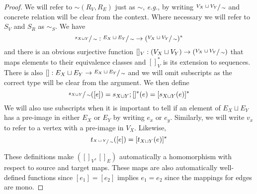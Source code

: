 \begin{proof}
	We will refer to $\sim (R_{V},R_{E})$ just as $\sim$, \textit{e.g.}, by writing $\sfrac{V_{X} \sqcup  V_{Y}}{\sim}$ and concrete relation will be clear from the context.
	Where necessary we will refer to $S_{V}$ and $S_{R}$ as $\sim_{S}$.
	We have
	\[
		\sfrac{s_{X\sqcup Y}}{\sim} : \sfrac{E_{X} \sqcup  E_{Y}}{\sim} \to (\sfrac{V_{X} \sqcup  V_{Y}}{\sim})^{*}
	\]
	and there is an obvious surjective function $[]_{V} : (V_{X} \sqcup  V_{Y}) \to (\sfrac{V_{X} \sqcup  V_{Y}}{\sim})$ that maps elements to their equivalence classes and $[]_{V}^{*}$ is its extension to sequences.
	There is also $[] : E_{X} \sqcup  E_{Y} \to \sfrac{E_{X} \sqcup  E_{Y}}{\sim}$ and we will omit subscripts as the correct type will be clear from the argument.
	We then define
	\[
		\sfrac{s_{X\sqcup Y}}{\sim}([e]) = s_{X\sqcup Y};[]^{*}(e) = [s_{X\sqcup Y}(e)]^{*}
	\]
	We will also use subscripts when it is important to tell if an element of $E_{X} \sqcup  E_{Y}$ has a pre-image in either $E_{X}$ or $E_{Y}$ by writing $e_{x}$ or $e_{y}$.
	Similarly, we will write $v_{x}$ to refer to a vertex with a pre-image in $V_{X}$.
	Likewise,
	\[
		t_{\sfrac{X\sqcup Y}{\sim}}([e]) = [t_{X\sqcup Y}(e)]^{*}
	\]

	These definitions make $([]_{V},[]_{E})$ automatically a homomorphism with respect to source and target maps.
	These maps are also automatically well-defined functions since $[e_1] = [e_2]$ implies $e_1 = e_2$ since the mappings for edges are mono.


\end{proof}
